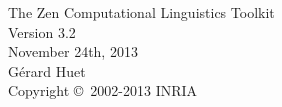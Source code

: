 
\def\lbr{\langle} %
\def\rbr{\rangle} %
\def\lsq{[} %
\def\rsq{]} %
\def\R{{\cal R}} %
\def\otrema{\"o} %
\def\skip{\vspace{10pt}}


%
\begin{center}
\vspace*{24pt}
{\Large The Zen Computational Linguistics Toolkit}\\[10pt]
{\Large Version 3.2}\\[15pt]
{November 24th, 2013}\\[15pt]
{\large G\'erard Huet}\\[10pt]
{\large Copyright \copyright ~2002-2013 INRIA}\\[20pt]
\end{center}

\tableofcontents

